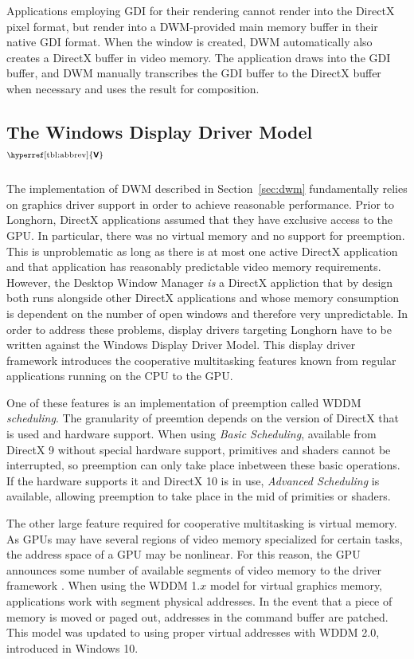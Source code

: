\documentclass[10pt,twocolumn,a4paper]{article}
\newcommand{\bs}[1]{\textbf{\sffamily #1}}
\newcommand{\winver}[1]{$^{\text{\hyperref[tbl:abbrev]{\bs{#1}}}}$}
\newcommand{\winsubsection}[2]{\subsection[#1]{#1\winver{#2}}}
\begin{document}
			Applications employing GDI for their rendering cannot render into
			the DirectX pixel format, but render into a DWM-provided main memory
			buffer in their native GDI format. When the window is created, DWM
			automatically also creates a DirectX buffer in video memory. The
			application draws into the GDI buffer, and DWM manually transcribes
			the GDI buffer to the DirectX buffer when necessary and uses the result
			for composition.
			\cite{dwmredirect}

		\winsubsection{The Windows Display Driver Mo\-del}{V}\label{sec:wddm}
			The implementation of DWM described in Section~\ref{sec:dwm}
			fundamentally relies on graphics driver support in order to achieve
			reasonable performance.  Prior to Longhorn, DirectX applications
			assumed that they have exclusive access to the GPU. In particular,
			there was no virtual memory and no support for preemption. This is
			unproblematic as long as there is at most one active DirectX application
			and that application has reasonably predictable video memory requirements.
			However, the Desktop Window Manager \emph{is} a DirectX appliction that
			by design both runs alongside other DirectX applications and whose
			memory consumption is dependent on the number of open windows and therefore
			very unpredictable.
			In order to address these problems, display drivers targeting Longhorn
			have to be written against the Windows Display Driver Model. This
			display driver framework introduces the cooperative multitasking
			features known from regular applications running on the CPU to the
			GPU. \cite{dwmwddm}

			One of these features is an implementation of preemption called
			WDDM \emph{scheduling}. The granularity of preemtion depends on
			the version of DirectX that is used and hardware support. When
			using \emph{Basic Scheduling}, available from DirectX 9 without
			special hardware support, primitives and shaders cannot be interrupted,
			so preemption can only take place inbetween these basic operations.
			If the hardware supports it and DirectX 10 is in use, \emph{Advanced
			Scheduling} is available, allowing preemption to take place in the mid
			of primities or shaders. \cite{dwmwddm}

			The other large feature required for cooperative multitasking is
			virtual memory. As GPUs may have several regions of video memory
			specialized for certain tasks, the address space of a GPU may
			be nonlinear. For this reason, the GPU announces some number of
			available segments of video memory to the driver framework \cite{gpuseg}.
			When using the WDDM 1.$x$ model for virtual graphics
			memory, applications work with segment physical addresses. In the event
			that a piece of memory is moved or paged out, addresses in the command
			buffer are patched. This model was updated to using proper virtual
			addresses with WDDM 2.0, introduced in Windows 10. \cite{wddm2}
\end{document}
